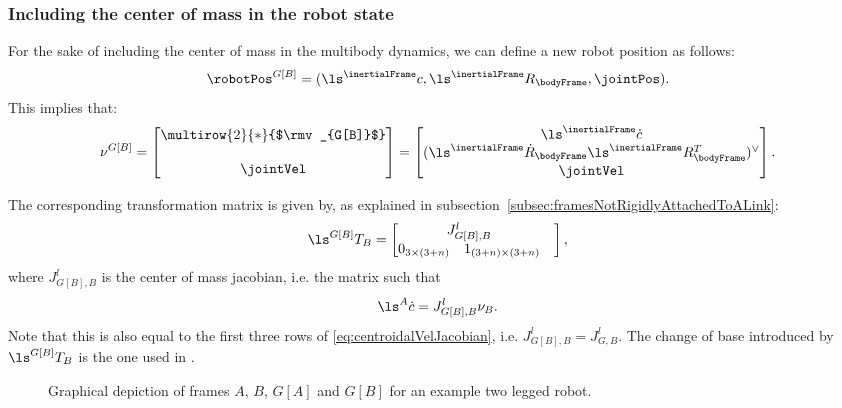 \subsubsection{Including the center of mass in the robot state}
For the sake of including the center of mass in the multibody dynamics, we can define a new robot position as follows:
\begin{equation}
\robotPos^{G[B]} = (\ls^{\inertialFrame}c ,\ls^{\inertialFrame}R_{\bodyFrame},\jointPos) .
\end{equation}
This implies that:
\begin{equation}
\nu^{G[B]} 
= 
\begin{bmatrix}
 \multirow{2}{*}{$\rmv_{G[B]}$}\\
  \\
 \jointVel 
\end{bmatrix}
= 
\begin{bmatrix}
 \ls^{\inertialFrame}\dot{c} \\
 (\ls^{\inertialFrame}\dot{R}_{\bodyFrame} \ls^{\inertialFrame}{R}_{\bodyFrame}^{T})^\vee \\ 
 \jointVel 
\end{bmatrix}.
\end{equation}

The corresponding transformation matrix is given by, as explained in subsection~\ref{subsec:framesNotRigidlyAttachedToALink}: 
\begin{equation}
\ls^{G[B]} T_{B} = 
\begin{bmatrix}
\multicolumn{2}{c}{J^l_{G[B],B}} &  \\ 
0_{3 \times (3+n)} & 1_{(3+n) \times (3+n)}  
\end{bmatrix},
\end{equation}
where $J^l_{G[B],B}$ is the center of mass jacobian, i.e. the matrix such that 
\[\ls^A \dot{c} = J^l_{G[B],B} \nu_B.\]
Note that this is also equal to the first three rows of \eqref{eq:centroidalVelJacobian}, i.e. $J^l_{G[B],B} = J^l_{G,B}$.
The change of base introduced by $\ls^{G[B]} T_B$ is the one used in \citep{ott2011posture}.

\begin{figure}
\caption{Graphical depiction of frames $A$, $B$, $G[A]$ and $G[B]$ for an example two legged robot.}
\label{fig:centroidalFigure}
\end{figure}


